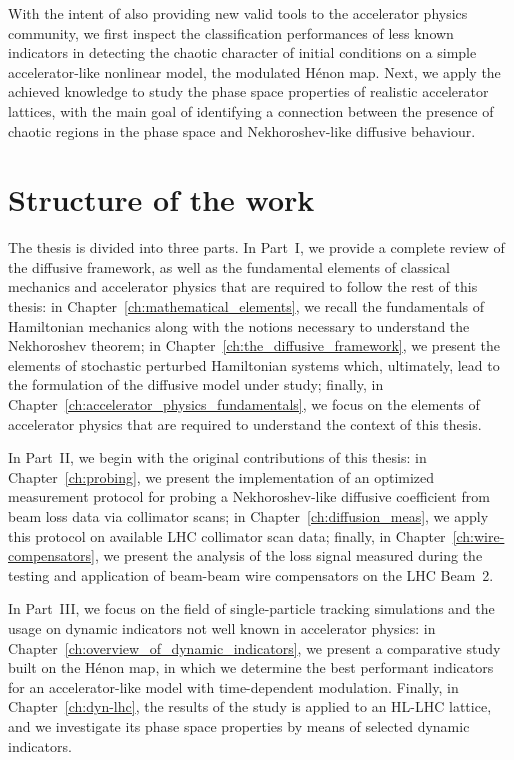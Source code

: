 With the intent of also providing new valid tools to the accelerator physics community, we first inspect the classification performances of less known indicators in detecting the chaotic character of initial conditions on a simple accelerator-like nonlinear model, the modulated Hénon map. Next, we apply the achieved knowledge to study the phase space properties of realistic accelerator lattices, with the main goal of identifying a connection between the presence of chaotic regions in the phase space and Nekhoroshev-like diffusive behaviour.

\section*{Structure of the work}

The thesis is divided into three parts. In Part~I, we provide a complete review of the diffusive framework, as well as the fundamental elements of classical mechanics and accelerator physics that are required to follow the rest of this thesis: in Chapter~\ref{ch:mathematical_elements}, we recall the fundamentals of Hamiltonian mechanics along with the notions necessary to understand the Nekhoroshev theorem; in Chapter~\ref{ch:the_diffusive_framework}, we present the elements of stochastic perturbed Hamiltonian systems which, ultimately, lead to the formulation of the diffusive model under study; finally, in Chapter~\ref{ch:accelerator_physics_fundamentals}, we focus on the elements of accelerator physics that are required to understand the context of this thesis.

In Part~II, we begin with the original contributions of this thesis: in Chapter~\ref{ch:probing}, we present the implementation of an optimized measurement protocol for probing a Nekhoroshev-like diffusive coefficient from beam loss data via collimator scans; in Chapter~\ref{ch:diffusion_meas}, we apply this protocol on available LHC collimator scan data; finally, in Chapter~\ref{ch:wire-compensators}, we present the analysis of the loss signal measured during the testing and application of beam-beam wire compensators on the LHC Beam~2.

In Part~III, we focus on the field of single-particle tracking simulations and the usage on dynamic indicators not well known in accelerator physics: in Chapter~\ref{ch:overview_of_dynamic_indicators}, we present a comparative study built on the Hénon map, in which we determine the best performant indicators for an accelerator-like model with time-dependent modulation. Finally, in Chapter~\ref{ch:dyn-lhc}, the results of the study is applied to an HL-LHC lattice, and we investigate its phase space properties by means of selected dynamic indicators.


